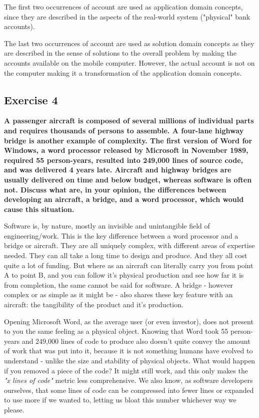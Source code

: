 \documentclass{article}
\begin{document}
The first two occurrences of account are used as application domain concepts, since they are described in the aspects of the real-world system ("physical" bank accounts).

The last two occurrences of account are used as solution domain concepts as they are described in the sense of solutions to the overall problem by making the accounts available on the mobile computer. However, the actual account is not on the computer making it a transformation of the application domain concepts.

\subsection*{Exercise 4}
\textbf{A passenger aircraft is composed of several millions of individual parts and requires thousands of persons to assemble. A four-lane highway bridge is another example of complexity. The first version of Word for Windows, a word processor released by Microsoft in November 1989, required 55 person-years, resulted into 249,000 lines of source code, and was delivered 4 years late. Aircraft and highway bridges are usually delivered on time and below budget, whereas software is often not. Discuss what are, in your opinion, the differences between developing an aircraft, a bridge, and a word processor, which would cause this situation.}

Software is, by nature, mostly an invisible and unintangible field of engineering/work. This is the key difference between a word processor and a bridge or aircraft. They are all uniquely complex, with different areas of expertise needed. They can all take a long time to design and produce. And they all cost quite a lot of funding. But where as an aircraft can literally carry you from point A to point B, and you can follow it's physical production and see how far it is from completion, the same cannot be said for software. A bridge - however complex or as simple as it might be - also shares these key feature with an aircraft: the tangibility of the product and it's production.

Opening Microsoft Word, as the average user (or even investor), does not present to you the same feeling as a physical object. Knowing that Word took 55 person-years and 249,000 lines of code to produce also doesn't quite convey the amount of work that was put into it, because it is not something humans have evolved to understand - unlike the size and stability of physical objects. What would happen if you removed a piece of the code? It might still work, and this only makes the \textit{"x lines of code"} metric less comprehensive. We also know, as software developers ourselves, that some lines of code can be compressed into fewer lines or expanded to use more if we wanted to, letting us bloat this number whichever way we please. 
\end{document}
